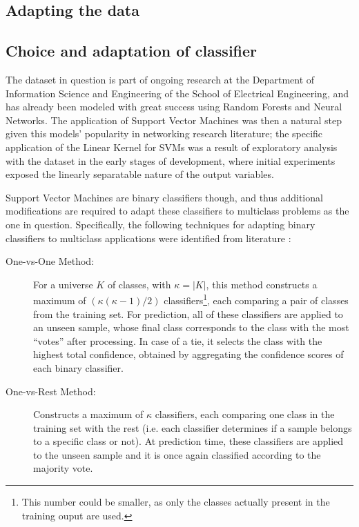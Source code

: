 \documentclass{kthreport}
\theoremstyle{definition}
\begin{document}
\subsection{Adapting the data} \label{sec:problemtransform}


\subsection{Choice and adaptation of classifier}\label{sec:cfchoice}

The dataset in question is part of ongoing research at the Department of Information Science and Engineering of the School of Electrical Engineering, and has already been modeled with great success using Random Forests and Neural Networks. The application of Support Vector Machines was then a natural step given this models' popularity in networking research literature; the specific application of the Linear Kernel for SVMs was a result of exploratory analysis with the dataset in the early stages of development, where initial experiments exposed the linearly separatable nature of the output variables.

Support Vector Machines are binary classifiers though, and thus additional modifications are required to adapt these classifiers to multiclass problems as the one in question. Specifically, the following techniques for adapting binary classifiers to multiclass applications were identified from literature \autocite{hsu2002comparison,tax2002multiclass}:

\begin{description}
	\item[One-vs-One Method:] For a universe $K$ of classes, with $\kappa = |K|$, this method constructs a maximum of $(\kappa(\kappa-1)/2)$ classifiers\footnote{This number could be smaller, as only the classes actually present in the training ouput are used.}, each comparing a pair of classes from the training set. For prediction, all of these classifiers are applied to an unseen sample, whose final class corresponds to the class with the most ``votes'' after processing. In case of a tie, it selects the class with the highest total confidence, obtained by aggregating the confidence scores of each binary classifier.
	\item[One-vs-Rest Method:] Constructs a maximum of $\kappa$ classifiers, each comparing one class in the training set with the rest (i.e. each classifier determines if a sample belongs to a specific class or not). At prediction time, these classifiers are applied to the unseen sample and it is once again classified according to the majority vote.
\end{description}
\end{document}
